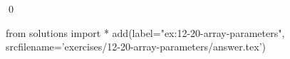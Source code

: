 
\begin{ex}
  \label{ex:12-20-array-parameters}
  
  \qed
\end{ex}
\begin{python0}
from solutions import *
add(label="ex:12-20-array-parameters",
    srcfilename='exercises/12-20-array-parameters/answer.tex')
\end{python0}
